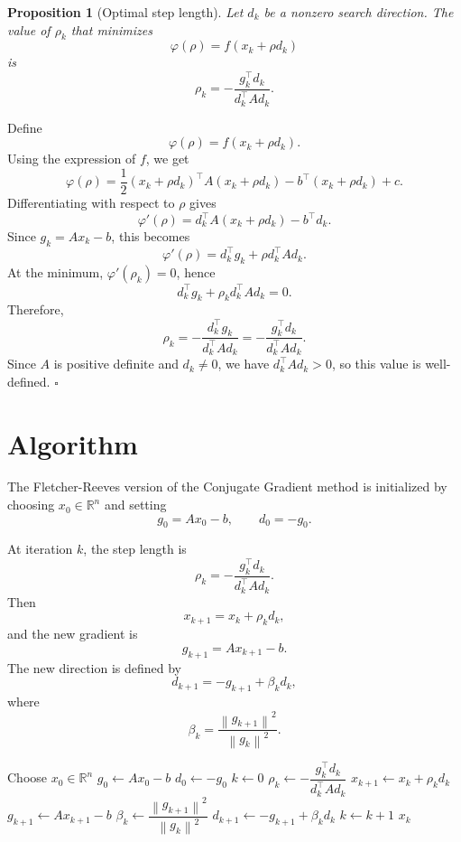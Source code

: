 \documentclass[11pt,a4paper]{report}
\theoremstyle{definition}
\theoremstyle{plain}
\newtheorem{proposition}{Proposition}[chapter]
\theoremstyle{remark}
\renewenvironment{proof}[1][Proof]{%
  \begin{tcolorbox}[enhanced, breakable, colback=white, colframe=black!25, boxrule=0.5pt, arc=1.5mm, borderline west={2pt}{0pt}{black!45}, title=\textbf{#1}, coltitle=bleufonce, fonttitle=\bfseries]
}{%
  \hfill$\square$\end{tcolorbox}
}
\newcommand{\norm}[1]{\left\lVert #1 \right\rVert}
\begin{document}
\begin{proposition}[Optimal step length]
Let $d_k$ be a nonzero search direction. The value of $\rho_k$ that minimizes
\[
\varphi(\rho)=f(x_k+\rho d_k)
\]
is
\[
\rho_k=-\frac{g_k^\top d_k}{d_k^\top A d_k}.
\]
\end{proposition}

\begin{proof}
Define
\[
\varphi(\rho)=f(x_k+\rho d_k).
\]
Using the expression of $f$, we get
\[
\varphi(\rho)=\frac12 (x_k+\rho d_k)^\top A(x_k+\rho d_k)-b^\top(x_k+\rho d_k)+c.
\]
Differentiating with respect to $\rho$ gives
\[
\varphi'(\rho)=d_k^\top A(x_k+\rho d_k)-b^\top d_k.
\]
Since $g_k=Ax_k-b$, this becomes
\[
\varphi'(\rho)=d_k^\top g_k+\rho d_k^\top A d_k.
\]
At the minimum, $\varphi'(\rho_k)=0$, hence
\[
d_k^\top g_k+\rho_k d_k^\top A d_k=0.
\]
Therefore,
\[
\rho_k=-\frac{d_k^\top g_k}{d_k^\top A d_k}=-\frac{g_k^\top d_k}{d_k^\top A d_k}.
\]
Since $A$ is positive definite and $d_k\neq 0$, we have $d_k^\top A d_k>0$, so this value is well-defined.
\end{proof}

\section{Algorithm}

The Fletcher-Reeves version of the Conjugate Gradient method is initialized by choosing $x_0\in\mathbb{R}^n$ and setting
\[
g_0=Ax_0-b,
\qquad
d_0=-g_0.
\]

At iteration $k$, the step length is
\[
\rho_k
=
-\frac{g_k^\top d_k}{d_k^\top A d_k}.
\]
Then
\[
x_{k+1}=x_k+\rho_k d_k,
\]
and the new gradient is
\[
g_{k+1}=Ax_{k+1}-b.
\]
The new direction is defined by
\[
d_{k+1}
=
-g_{k+1}
+
\beta_k d_k,
\]
where
\[
\beta_k
=
\frac{\norm{g_{k+1}}^2}{\norm{g_k}^2}.
\]

\begin{algorithm}[H]
\caption{Conjugate Gradient Method}
\begin{algorithmic}[1]
\State Choose $x_0\in\mathbb{R}^n$
\State $g_0\gets Ax_0-b$
\State $d_0\gets -g_0$
\State $k\gets 0$
\While{$\norm{g_k}>\text{tol}$ and $k<\text{max\_iter}$}
    \State $\rho_k\gets -\dfrac{g_k^\top d_k}{d_k^\top A d_k}$
    \State $x_{k+1}\gets x_k+\rho_k d_k$
    \State $g_{k+1}\gets Ax_{k+1}-b$
    \State $\beta_k\gets \dfrac{\norm{g_{k+1}}^2}{\norm{g_k}^2}$
    \State $d_{k+1}\gets -g_{k+1}+\beta_k d_k$
    \State $k\gets k+1$
\EndWhile
\State \Return $x_k$
\end{algorithmic}
\end{algorithm}
\end{document}
